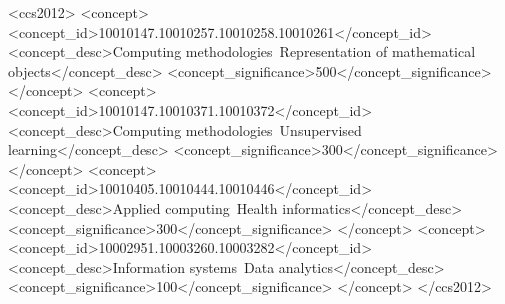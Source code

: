\documentclass[sigconf,nonacm]{acmart}
\begin{document}
\begin{CCSXML}
<ccs2012>
 <concept>
  <concept_id>10010147.10010257.10010258.10010261</concept_id>
  <concept_desc>Computing methodologies~Representation of mathematical objects</concept_desc>
  <concept_significance>500</concept_significance>
 </concept>
 <concept>
  <concept_id>10010147.10010371.10010372</concept_id>
  <concept_desc>Computing methodologies~Unsupervised learning</concept_desc>
  <concept_significance>300</concept_significance>
 </concept>
 <concept>
  <concept_id>10010405.10010444.10010446</concept_id>
  <concept_desc>Applied computing~Health informatics</concept_desc>
  <concept_significance>300</concept_significance>
 </concept>
 <concept>
  <concept_id>10002951.10003260.10003282</concept_id>
  <concept_desc>Information systems~Data analytics</concept_desc>
  <concept_significance>100</concept_significance>
 </concept>
</ccs2012>
\end{CCSXML}



\maketitle








\clearpage



\clearpage

\end{document}
